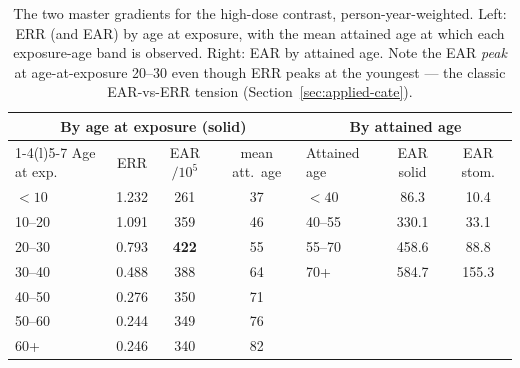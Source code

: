 \documentclass[11pt]{article}
\begin{document}
\begin{table}[htbp]
\centering
\caption{The two master gradients for the high-dose contrast,
person-year-weighted. Left: ERR (and EAR) by age at exposure, with the mean
attained age at which each exposure-age band is observed. Right: EAR by
attained age. Note the EAR \emph{peak} at age-at-exposure 20--30 even though
ERR peaks at the youngest --- the classic EAR-vs-ERR tension
(Section~\ref{sec:applied-cate}).}
\label{tab:applied-gradients}
\small
\begin{tabular}{lccc@{\hskip 1.2cm}lcc}
\toprule
\multicolumn{4}{c}{By age at exposure (solid)} & \multicolumn{3}{c}{By attained age} \\
\cmidrule(r){1-4}\cmidrule(l){5-7}
Age at exp. & ERR & EAR$/10^5$ & mean att.\ age & Attained age & EAR solid & EAR stom. \\
\midrule
$<10$  & 1.232 & 261 & 37 & $<40$   & 86.3  & 10.4 \\
10--20 & 1.091 & 359 & 46 & 40--55  & 330.1 & 33.1 \\
20--30 & 0.793 & \textbf{422} & 55 & 55--70 & 458.6 & 88.8 \\
30--40 & 0.488 & 388 & 64 & 70+     & 584.7 & 155.3 \\
40--50 & 0.276 & 350 & 71 &         &       &      \\
50--60 & 0.244 & 349 & 76 &         &       &      \\
60+    & 0.246 & 340 & 82 &         &       &      \\
\bottomrule
\end{tabular}
\end{table}
\end{document}
